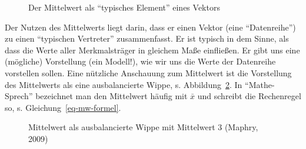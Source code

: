 \documentclass[
  letterpaper,
  twoside,
  open=any]{scrbook}
\theoremstyle{definition}
\theoremstyle{definition}
\theoremstyle{definition}
\theoremstyle{remark}
\begin{document}
\begin{figure}


\caption{\label{fig-mw2}Der Mittelwert als \enquote{typisches Element}
eines Vektors}

\end{figure}%

Der Nutzen des Mittelwerts liegt darin, dass er einen Vektor (eine
\enquote{Datenreihe}) zu einen \enquote{typischen Vertreter}
zusammenfasst. Er ist typisch in dem Sinne, als dass die Werte aller
Merkmalsträger in gleichem Maße einfließen. Er gibt uns eine (mögliche)
Vorstellung (ein Modell!), wie wir uns die Werte der Datenreihe
vorstellen sollen. Eine nützliche Anschauung zum Mittelwert ist die
Vorstellung des Mittelwerts als eine ausbalancierte Wippe, s.
Abbildung~\ref{fig-wippe}. In \enquote{Mathe-Sprech} bezeichnet man den
Mittelwert häufig mit \(\bar{x}\) und schreibt die Rechenregel so, s.
Gleichung~\ref{eq-mw-formel}.

\begin{figure}


\caption{\label{fig-wippe}Mittelwert als ausbalancierte Wippe mit
Mittelwert 3 (Maphry, 2009)}

\end{figure}%
\end{document}
